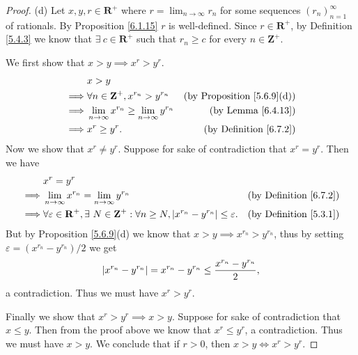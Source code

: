 \begin{proof}{(d)}
    Let \(x, y, r \in \mathbf{R}^+\) where \(r = \lim_{n \to \infty} r_n\) for some sequences \((r_n)_{n = 1}^\infty\) of rationals.
    By Proposition \ref{6.1.15} \(r\) is well-defined.
    Since \(r \in \mathbf{R}^+\), by Definition \ref{5.4.3} we know that \(\exists\ c \in \mathbf{R}^+\) such that \(r_n \geq c\) for every \(n \in \mathbf{Z}^+\).

    We first show that \(x > y \implies x^r > y^r\).
    \begin{align*}
                 & x > y                                                                                                 \\
        \implies & \forall n \in \mathbf{Z}^+, x^{r_n} > y^{r_n}                & \text{(by Proposition \ref{5.6.9}(d))} \\
        \implies & \lim_{n \to \infty} x^{r_n} \geq \lim_{n \to \infty} y^{r_n} & \text{(by Lemma \ref{6.4.13})}         \\
        \implies & x^r \geq y^r.                                                & \text{(by Definition \ref{6.7.2})}
    \end{align*}
    Now we show that \(x^r \neq y^r\).
    Suppose for sake of contradiction that \(x^r = y^r\).
    Then we have
    \begin{align*}
                 & x^r = y^r                                                                                                                                                             \\
        \implies & \lim_{n \to \infty} x^{r_n} = \lim_{n \to \infty} y^{r_n}                                                                        & \text{(by Definition \ref{6.7.2})} \\
        \implies & \forall \varepsilon \in \mathbf{R}^+, \exists\ N \in \mathbf{Z}^+ : \forall n \geq N, \abs*{x^{r_n} - y^{r_n}} \leq \varepsilon. & \text{(by Definition \ref{5.3.1})}
    \end{align*}
    But by Proposition \ref{5.6.9}(d) we know that \(x > y \implies x^{r_n} > y^{r_n}\), thus by setting \(\varepsilon = (x^{r_n} - y^{r_n}) / 2\) we get
    \[
        \abs*{x^{r_n} - y^{r_n}} = x^{r_n} - y^{r_n} \leq \frac{x^{r_n} - y^{r_n}}{2},
    \]
    a contradiction.
    Thus we must have \(x^r > y^r\).

    Finally we show that \(x^r > y^r \implies x > y\).
    Suppose for sake of contradiction that \(x \leq y\).
    Then from the proof above we know that \(x^r \leq y^r\), a contradiction.
    Thus we must have \(x > y\).
    We conclude that if \(r > 0\), then \(x > y \iff x^r > y^r\).
\end{proof}

